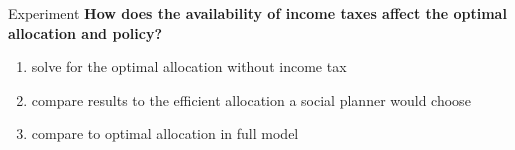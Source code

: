 \documentclass[11pt,aspectratio=169]{beamer}
\newcommand{\ar}{$\Rightarrow$ \ }
\begin{document}
\begin{frame}{Experiment}
\hspace{-6mm}	\alert{\textbf{How does the availability of income taxes affect the optimal allocation and policy?}}

	\begin{enumerate}
		\item<2-> solve for the optimal allocation  without income tax
		\vspace{2mm}
		\item<3-> compare results to the efficient allocation a social planner would choose						\vspace{2mm}
		\item<4-> compare to optimal allocation in full model 
		\vspace{2mm}
	\end{enumerate}
\end{frame}
\end{document}
